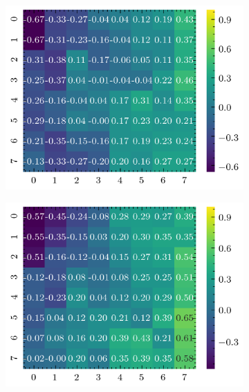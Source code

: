 \begin{figure}[H]
\begin{subfigure}[b]{0.19\textwidth}
        \includegraphics[width=\linewidth]{../img/5/quarry/worst/heatmap-2d-2.png}
    \end{subfigure}
    \begin{subfigure}[b]{0.19\textwidth}
        \includegraphics[width=\linewidth]{../img/5/quarry/worst/heatmap-2d-3.png}
    \end{subfigure}  
    \begin{subfigure}[b]{0.19\textwidth}

\end{subfigure}
\end{figure}
